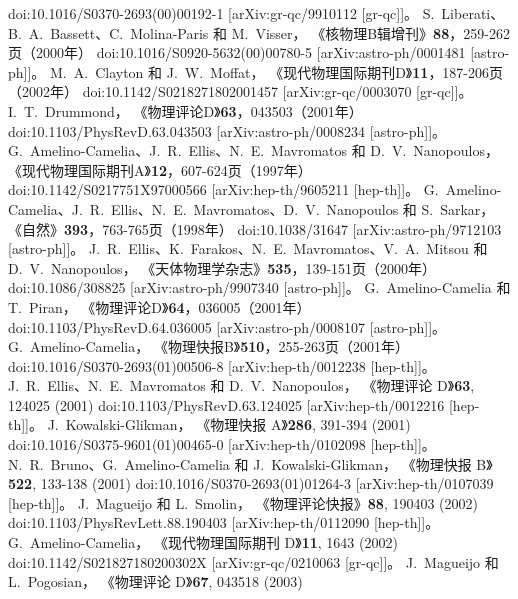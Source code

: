 \documentclass[jkps,preprint,fleqn]{revtex4}
\begin{document}
\begin{CJK*}{UTF8}{gbsn}
\begin{thebibliography}{999}
doi:10.1016/S0370-2693(00)00192-1
[arXiv:gr-qc/9910112 [gr-qc]]。
S.~Liberati、B.~A.~Bassett、C.~Molina-Paris 和 M.~Visser，
《核物理B辑增刊》\textbf{88}，259-262页（2000年）
doi:10.1016/S0920-5632(00)00780-5
[arXiv:astro-ph/0001481 [astro-ph]]。
M.~A.~Clayton 和 J.~W.~Moffat，
《现代物理国际期刊D》\textbf{11}，187-206页（2002年）
doi:10.1142/S0218271802001457
[arXiv:gr-qc/0003070 [gr-qc]]。
I.~T.~Drummond，
《物理评论D》\textbf{63}，043503（2001年）
doi:10.1103/PhysRevD.63.043503
[arXiv:astro-ph/0008234 [astro-ph]]。
G.~Amelino-Camelia、J.~R.~Ellis、N.~E.~Mavromatos 和 D.~V.~Nanopoulos，
《现代物理国际期刊A》\textbf{12}，607-624页（1997年）
doi:10.1142/S0217751X97000566
[arXiv:hep-th/9605211 [hep-th]]。
G.~Amelino-Camelia、J.~R.~Ellis、N.~E.~Mavromatos、D.~V.~Nanopoulos 和 S.~Sarkar，
《自然》\textbf{393}，763-765页（1998年）
doi:10.1038/31647
[arXiv:astro-ph/9712103 [astro-ph]]。
J.~R.~Ellis、K.~Farakos、N.~E.~Mavromatos、V.~A.~Mitsou 和 D.~V.~Nanopoulos，
《天体物理学杂志》\textbf{535}，139-151页（2000年）
doi:10.1086/308825
[arXiv:astro-ph/9907340 [astro-ph]]。
G.~Amelino-Camelia 和 T.~Piran，
《物理评论D》\textbf{64}，036005（2001年）
doi:10.1103/PhysRevD.64.036005
[arXiv:astro-ph/0008107 [astro-ph]]。
G.~Amelino-Camelia，
《物理快报B》\textbf{510}，255-263页（2001年）
doi:10.1016/S0370-2693(01)00506-8  
[arXiv:hep-th/0012238 [hep-th]]。  
J.~R.~Ellis、N.~E.~Mavromatos 和 D.~V.~Nanopoulos，  
《物理评论 D》\textbf{63}, 124025 (2001)  
doi:10.1103/PhysRevD.63.124025  
[arXiv:hep-th/0012216 [hep-th]]。  
J.~Kowalski-Glikman，  
《物理快报 A》\textbf{286}, 391-394 (2001)  
doi:10.1016/S0375-9601(01)00465-0  
[arXiv:hep-th/0102098 [hep-th]]。  
N.~R.~Bruno、G.~Amelino-Camelia 和 J.~Kowalski-Glikman，  
《物理快报 B》\textbf{522}, 133-138 (2001)  
doi:10.1016/S0370-2693(01)01264-3  
[arXiv:hep-th/0107039 [hep-th]]。  
J.~Magueijo 和 L.~Smolin，  
《物理评论快报》\textbf{88}, 190403 (2002)  
doi:10.1103/PhysRevLett.88.190403  
[arXiv:hep-th/0112090 [hep-th]]。  
G.~Amelino-Camelia，  
《现代物理国际期刊 D》\textbf{11}, 1643 (2002)  
doi:10.1142/S021827180200302X  
[arXiv:gr-qc/0210063 [gr-qc]]。  
J.~Magueijo 和 L.~Pogosian，  
《物理评论 D》\textbf{67}, 043518 (2003)  

\end{thebibliography}
\end{CJK*}
\end{document}
